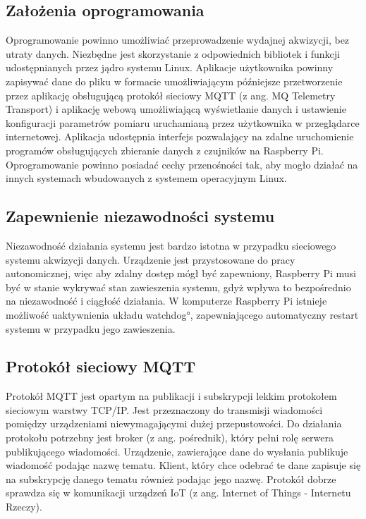 \bigskip



\subsection{Założenia oprogramowania}

Oprogramowanie powinno umożliwiać przeprowadzenie wydajnej akwizycji, bez utraty danych.
Niezbędne jest skorzystanie z odpowiednich bibliotek i funkcji udostępnianych przez jądro systemu Linux. Aplikacje użytkownika powinny zapisywać dane do pliku w formacie umożliwiającym późniejsze przetworzenie przez aplikację obsługującą protokół sieciowy MQTT (z ang. MQ Telemetry Transport) i aplikację webową umożliwiającą wyświetlanie danych i ustawienie konfiguracji parametrów pomiaru uruchamianą przez użytkownika w przeglądarce internetowej. Aplikacja udostępnia interfejs pozwalający na zdalne uruchomienie programów obsługujących zbieranie danych z czujników na Raspberry Pi. Oprogramowanie powinno posiadać cechy przenośności tak, aby mogło działać na innych systemach wbudowanych z systemem operacyjnym Linux.
\newpage
\subsection{Zapewnienie niezawodności systemu}
Niezawodność działania systemu jest bardzo istotna w przypadku sieciowego systemu akwizycji danych. Urządzenie jest przystosowane do pracy autonomicznej, więc aby zdalny dostęp mógł być zapewniony, Raspberry Pi musi być w stanie wykrywać stan zawieszenia systemu, gdyż wpływa to bezpośrednio na niezawodność i ciągłość działania. 
W komputerze Raspberry Pi istnieje możliwość uaktywnienia układu \ang{watchdog}, zapewniającego automatyczny restart systemu w przypadku jego zawieszenia. 


\subsection{Protokół sieciowy MQTT}

Protokół MQTT jest opartym na publikacji i subskrypcji lekkim protokołem sieciowym warstwy TCP/IP\cite{mqtt}. Jest przeznaczony do transmisji wiadomości pomiędzy urządzeniami niewymagającymi dużej przepustowości. Do działania protokołu potrzebny jest broker (z ang. pośrednik), który pełni rolę serwera publikującego wiadomości. Urządzenie, zawierające dane do wysłania publikuje wiadomość podając nazwę tematu. Klient, który chce odebrać te dane zapisuje się na subskrypcję danego tematu również podając jego nazwę. 
Protokół dobrze sprawdza się w komunikacji urządzeń IoT (z ang. Internet of Things - Internetu Rzeczy).



